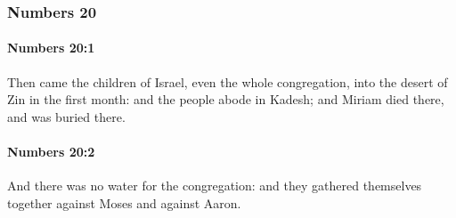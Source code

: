 	\subsubsection{Numbers 20} %
		\label{NUMBERS-20}

		\paragraph{Numbers 20:1} %
			\label{NUMBERS-20-1}

			Then came the children of Israel, even the whole congregation, into the desert of Zin in the first month: and the people abode in Kadesh; and Miriam died there, and was buried there.


		\paragraph{Numbers 20:2} %
			\label{NUMBERS-20-2}

			And there was no water for the congregation: and they gathered themselves together against Moses and against Aaron.

